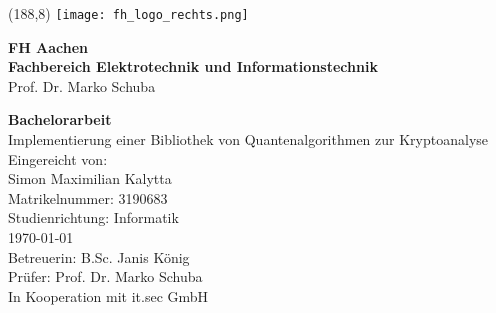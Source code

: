 \begin{titlepage}

\thispagestyle{empty}%
\setlength{\oddsidemargin}{0cm}%
\enlargethispage{\baselineskip}
\begin{textblock}{20}(188,8)%
    \texttt{[image: fh\_logo\_rechts.png]}%
 \end{textblock}%
\vspace*{-1.0cm}
\LARGE\textbf{FH Aachen}\\
\Large\textbf{Fachbereich Elektrotechnik und Informationstechnik}\\
\large Prof. Dr. Marko Schuba
\vspace{2cm}
\begin{center}
	\LARGE\textbf{Bachelorarbeit}\\
	\vspace{1.75cm}
	\LARGE Implementierung einer Bibliothek von Quantenalgorithmen zur Kryptoanalyse\\
	\large
	\vspace{2.5cm}
	Eingereicht von:\\
	Simon Maximilian Kalytta\\
	Matrikelnummer: 3190683\\
	\vspace{1cm}
	Studienrichtung: Informatik\\
	\vspace{1cm}
	\today\\
	\vspace{1.5cm}
	Betreuerin: B.Sc. Janis König\\
	Prüfer: Prof. Dr. Marko Schuba\\
        \vspace{0.5cm}
        In Kooperation mit it.sec GmbH
\end{center}
\end{titlepage}